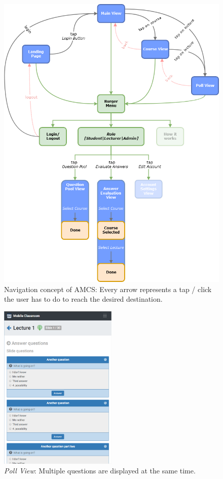 \begin{figure}[ht]
	\centering
	\includegraphics[width=\textwidth]{diagrams/amcs-click-paths.png}
	\caption{Navigation concept of AMCS: Every arrow represents a tap / click the user has to do to reach the desired destination.}
	\label{figure:clickpathproblems}
\end{figure}

\begin{figure}
	\vspace*{-0.5cm}
	\begin{center}
	\includegraphics[width=0.5\textwidth]{screenshots/poll_view_2.png}
	\end{center}
	\caption{\emph{Poll View}: Multiple questions are displayed at the same time.}
	\label{figure:pollview}
	\vspace*{-1.5cm}
\end{figure}

